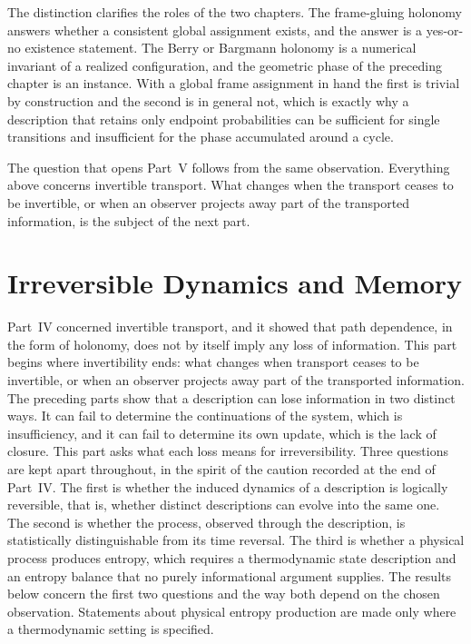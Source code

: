 \documentclass[11pt,oneside]{book}
\theoremstyle{definition}
\theoremstyle{remark}
\begin{document}
The distinction clarifies the roles of the two chapters. The frame-gluing holonomy answers whether a consistent global assignment exists, and the answer is a yes-or-no existence statement. The Berry or Bargmann holonomy is a numerical invariant of a realized configuration, and the geometric phase of the preceding chapter is an instance. With a global frame assignment in hand the first is trivial by construction and the second is in general not, which is exactly why a description that retains only endpoint probabilities can be sufficient for single transitions and insufficient for the phase accumulated around a cycle.

The question that opens Part~V follows from the same observation. Everything above concerns invertible transport. What changes when the transport ceases to be invertible, or when an observer projects away part of the transported information, is the subject of the next part.

\part{Irreversible Dynamics and Memory}

Part~IV concerned invertible transport, and it showed that path dependence, in the form of holonomy, does not by itself imply any loss of information. This part begins where invertibility ends: what changes when transport ceases to be invertible, or when an observer projects away part of the transported information. The preceding parts show that a description can lose information in two distinct ways. It can fail to determine the continuations of the system, which is insufficiency, and it can fail to determine its own update, which is the lack of closure. This part asks what each loss means for irreversibility. Three questions are kept apart throughout, in the spirit of the caution recorded at the end of Part~IV. The first is whether the induced dynamics of a description is logically reversible, that is, whether distinct descriptions can evolve into the same one. The second is whether the process, observed through the description, is statistically distinguishable from its time reversal. The third is whether a physical process produces entropy, which requires a thermodynamic state description and an entropy balance that no purely informational argument supplies. The results below concern the first two questions and the way both depend on the chosen observation. Statements about physical entropy production are made only where a thermodynamic setting is specified.
\end{document}
